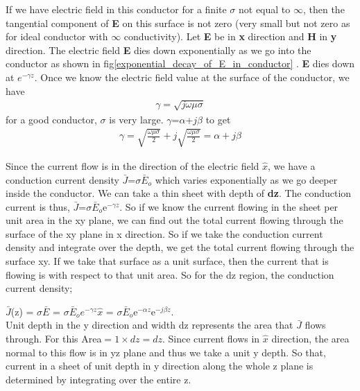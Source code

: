 If we have electric field in this conductor for a finite $\sigma$ not equal to $\infty$, then the tangential component of \textbf{E} on this surface is not zero (very small but not zero as for ideal conductor with $\infty$ conductivity). Let \textbf{E} be in \textbf{x} direction and \textbf{H} in \textbf{y} direction. The electric field \textbf{E} dies down exponentially as we go into the conductor as shown in fig\ref{exponential_decay_of_E_in_conductor} . \textbf{E} dies down at $e^{-\gamma z}$. Once we know the electric field value at the surface of the conductor, we have
\begin{align}
\gamma=\sqrt{\textit{j}\omega\mu\sigma}
\end{align}
for a good conductor, $\sigma$ is very large. $\gamma$=$\alpha$+$j\beta$ to get
\begin{align}
\gamma=\sqrt{\frac{\omega\mu\sigma}{2}}+\textit{j}\sqrt{\frac{\omega\mu\sigma}{2}}=\alpha+\textit{j}\beta
\end{align}

Since the current flow is in the direction of the electric field $\hat{x}$, we have a conduction current density $\bar{J}$=$\sigma\bar{E}_o$ which varies exponentially as we go deeper inside the conductor. We can take a thin sheet with depth of \textbf{dz}. The conduction current is thus, $\bar{J}$=$\sigma\bar{E}_o$e$^{-\gamma z}$. So if we know the current flowing in the sheet per unit area in the xy plane, we can find out the total current flowing through the surface of the xy plane in x direction. So if we take the conduction current density and integrate over the depth, we get the total current flowing through the surface xy. If we take that surface as a unit surface, then the current that is flowing is with respect to that unit area. So for the dz region, the conduction current density;

$\bar{J}$(z) = $\sigma$$\bar{E}$ = $\sigma\bar{E}_oe^{-\gamma z} \hat{x}$ = $\sigma\bar{E}_o$e$^{-\alpha z}$e$^{-j\beta z}$.\\
Unit depth in the y direction and width dz represents the area that $\bar{J}$ flows through. For this Area$=1\times dz=dz$. Since current flows in $\hat{x}$ direction, the area normal to this flow is in yz plane and thus we take a unit y depth. So that, current in a sheet of unit depth in y direction along the whole z plane is determined by integrating over the entire z.

